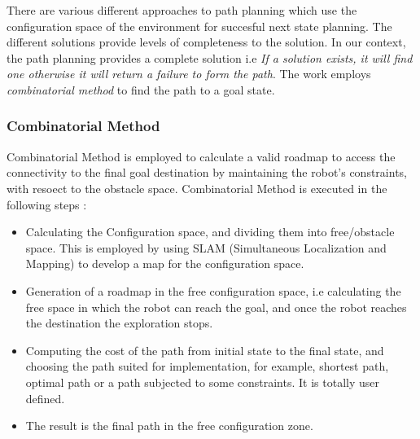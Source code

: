 There are various different approaches to path planning which use the configuration space of the environment for succesful next state planning. The different solutions provide levels of completeness to the solution. In our context, the path planning provides a complete solution i.e \textit{If a solution exists, it will find one otherwise it will return a failure to form the path}. 
The work employs \textit{combinatorial method} to find the path to a goal state. 

\subsubsection{Combinatorial Method}
Combinatorial Method is employed to calculate a valid roadmap to access the connectivity to the final goal destination by maintaining the robot's constraints, with resoect to the obstacle space.
Combinatorial Method is executed in the following steps : 
\begin{itemize}
    \item Calculating the Configuration space, and dividing them into free/obstacle space. This is employed by using SLAM (Simultaneous Localization and Mapping) to develop a map for the configuration space.
    \item Generation of a roadmap in the free configuration space, i.e calculating the free space in which the robot can reach the goal, and once the robot reaches the destination the exploration stops.
    \item Computing the cost of the path from initial state to the final state, and choosing the path suited for implementation, for example, shortest path, optimal path or a path subjected to some constraints. It is totally user defined.
    \item The result is the final path in the free configuration zone.
\end{itemize}

